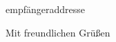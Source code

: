 \documentclass[a4paper,10pt,fromphone,fromemail,fromrule=afteraddress]{scrlttr2}
\begin{document}
\pagestyle{headings} %

\begin{letter}{empfängeraddresse}

\opening{}
\closing{Mit freundlichen Grüßen}

\end{letter}
\end{document}

